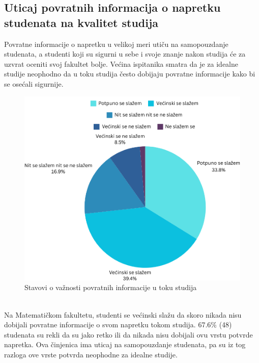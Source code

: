 \documentclass[a4paper]{article}
\begin{document}
\subsection{Uticaj povratnih informacija o napretku studenata na kvalitet studija}
\label{subsec:podnaslov2}

Povratne informacije o napretku u velikoj meri utiču na samopouzdanje studenata, a studenti koji su sigurni u sebe i svoje znanje nakon studija će za uzvrat oceniti svoj fakultet bolje. Većina ispitanika smatra da je za idealne studije neophodno da u toku studija često dobijaju povratne informacije kako bi se osećali sigurnije. \\
\begin{figure}[h!]
\begin{center}
    \includegraphics[scale = 0.3]{PieChartPovratneInformacije.png}
    \caption{Stavovi o važnosti povratnih informacije u toku studija}
    \label{fig:povratne_informacije}
\end{center}
\end{figure}
\\Na Matematičkom fakultetu, studenti se većinski slažu da skoro nikada nisu dobijali povratne informacije o svom napretku tokom studija. 67.6\% (48) studenata su rekli da su jako retko ili da nikada nisu dobijali ovu vrstu potvrde napretka. Ova činjenica ima uticaj na samopouzdanje studenata, pa su iz tog razloga ove vrste potvrda neophodne za idealne studije. \\
\end{document}
